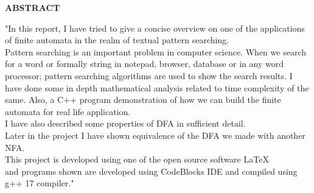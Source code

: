 \documentclass[12pt,a4paper]{article}%
\begin{document}
	\begin{center}
		\textbf{\large ABSTRACT}
	\end{center}
    \begin{flushleft}  \fontsize{12pt}{18pt}\selectfont
		"In this report, I have tried to give a concise overview on one of the applications of finite automata in the realm of textual pattern searching.\\\bigskip Pattern searching is an important problem in computer science. When we search for a word or formally string in notepad, browser, database or in any word processor; pattern searching algorithms are used to show the search results. I have done some in depth mathematical analysis related to time complexity of the same. Also, a C++ program demonstration of  how we can build the finite automata for real life application. \\\bigskip I have also described some properties of DFA in sufficient detail.\\\bigskip Later in the project I have shown equivalence of the DFA we made with another NFA.\\\bigskip This project is developed using one of the open source software \LaTeX\\ and programs shown are developed using CodeBlocks IDE and compiled using g++ 17 compiler." 
	\end{flushleft}
	
	\pagebreak
	\tableofcontents
	\cleardoublepage
\end{document}
